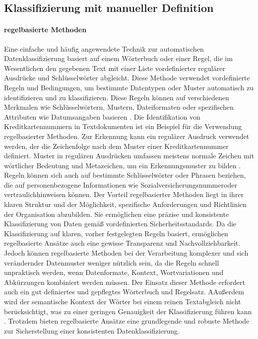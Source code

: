 \subsection{Klassifizierung mit manueller Definition}

\paragraph{regelbasierte Methoden}
Eine einfache und häufig angewendete Technik zur automatischen Datenklassifizierung basiert auf einem Wörterbuch oder einer Regel, die im Wesentlichen den gegebenen Text mit einer Liste vordefinierter regulärer Ausdrücke und Schlüsselwörter abgleicht. Diese Methode verwendet vordefinierte Regeln und Bedingungen, um bestimmte Datentypen oder Muster automatisch zu identifizieren und zu klassifizieren. Diese Regeln können auf verschiedenen Merkmalen wie Schlüsselwörtern, Mustern, Dateiformaten oder spezifischen Attributen wie Datumsangaben basieren \cite{Ong.2017}.
Die Identifikation von Kreditkartennummern in Textdokumenten ist ein Beispiel für die Verwendung regelbasierter Methoden. Zur Erkennung kann ein regulärer Ausdruck verwendet werden, der die Zeichenfolge nach dem Muster einer Kreditkartennummer definiert. Muster in regulären Ausdrücken umfassen meistens normale Zeichen mit wörtlicher Bedeutung und Metazeichen, um ein Erkennungsmuster zu bilden \cite{Alneyadi.2016}.
Regeln können sich auch auf bestimmte Schlüsselwörter oder Phrasen beziehen, die auf personenbezogene Informationen wie \glqq Sozialversicherungsnummer\grqq \:oder \glqq vertraulich\grqq \:hinweisen können.
Der Vorteil regelbasierter Methoden liegt in ihrer klaren Struktur und der Möglichkeit, spezifische Anforderungen und Richtlinien der Organisation abzubilden. Sie ermöglichen eine präzise und konsistente Klassifizierung von Daten gemäß vordefinierten Sicherheitsstandards. Da die Klassifizierung auf klaren, vorher festgelegten Regeln basiert, ermöglichen regelbasierte Ansätze auch eine gewisse Transparenz und Nachvollziehbarkeit.
Jedoch können regelbasierte Methoden bei der Verarbeitung komplexer und sich verändernder Datenmuster weniger nützlich sein, da die Regeln schnell unpraktisch werden, wenn Datenformate, Kontext, Wortvariationen und Abkürzungen kombiniert werden müssen. Der Einsatz dieser Methode erfordert auch ein gut definiertes und gepflegtes Wörterbuch und Regelsatz. AAußerdem wird der semantische Kontext der Wörter bei einem reinen Textabgleich nicht berücksichtigt, was zu einer geringen Genauigkeit der Klassifizierung führen kann \cite{Ong.2017}.
Trotzdem bieten regelbasierte Ansätze eine grundlegende und robuste Methode zur Sicherstellung einer konsistenten Datenklassifizierung.

